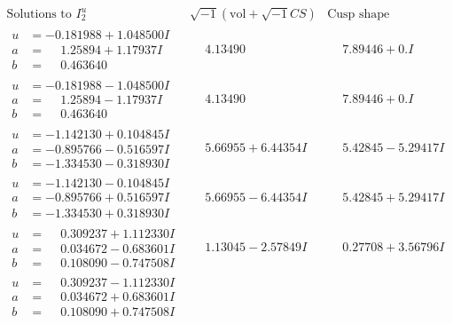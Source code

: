 \documentclass[1p]{elsarticle_modified}
\theoremstyle{definition}
\newcommand{\I}{\sqrt{-1}}
\begin{document}
$$\begin{array}{c|c|c}  
\text{Solutions to }I^u_{2}& \I (\text{vol} + \sqrt{-1}CS) & \text{Cusp shape}\\
 \hline 
\begin{aligned}
u &= -0.181988 + 1.048500 I \\
a &= \phantom{-}1.25894 + 1.17937 I \\
b &= \phantom{-}0.463640\phantom{ +0.000000I}\end{aligned}
 & \phantom{-}4.13490\phantom{ +0.000000I} & \phantom{-}7.89446 + 0. I\phantom{ +0.000000I} \\ \hline\begin{aligned}
u &= -0.181988 - 1.048500 I \\
a &= \phantom{-}1.25894 - 1.17937 I \\
b &= \phantom{-}0.463640\phantom{ +0.000000I}\end{aligned}
 & \phantom{-}4.13490\phantom{ +0.000000I} & \phantom{-}7.89446 + 0. I\phantom{ +0.000000I} \\ \hline\begin{aligned}
u &= -1.142130 + 0.104845 I \\
a &= -0.895766 - 0.516597 I \\
b &= -1.334530 - 0.318930 I\end{aligned}
 & \phantom{-}5.66955 + 6.44354 I & \phantom{-}5.42845 - 5.29417 I \\ \hline\begin{aligned}
u &= -1.142130 - 0.104845 I \\
a &= -0.895766 + 0.516597 I \\
b &= -1.334530 + 0.318930 I\end{aligned}
 & \phantom{-}5.66955 - 6.44354 I & \phantom{-}5.42845 + 5.29417 I \\ \hline\begin{aligned}
u &= \phantom{-}0.309237 + 1.112330 I \\
a &= \phantom{-}0.034672 - 0.683601 I \\
b &= \phantom{-}0.108090 - 0.747508 I\end{aligned}
 & \phantom{-}1.13045 - 2.57849 I & \phantom{-}0.27708 + 3.56796 I \\ \hline\begin{aligned}
u &= \phantom{-}0.309237 - 1.112330 I \\
a &= \phantom{-}0.034672 + 0.683601 I \\
b &= \phantom{-}0.108090 + 0.747508 I\end{aligned}

\end{array}$$
\end{document}
